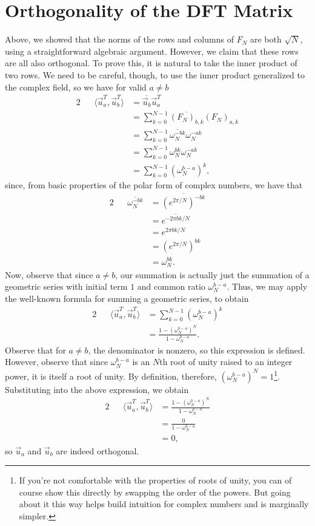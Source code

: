 \documentclass[letterpaper]{article}
\theoremstyle{remark}
\newcommand{\eqn}[1]{\begin{alignat*}{2}#1\end{alignat*}}
\begin{document}
\section{Orthogonality of the DFT Matrix}
Above, we showed that the norms of the rows and columns of $F_N$ are both $\sqrt{N}$, using a straightforward algebraic argument. However, we claim that these rows are all also orthogonal. To prove this, it is natural to take the inner product of two rows. We need to be careful, though, to use the inner product generalized to the complex field, so we have for valid $a \ne b$
\eqn{
    && \langle \vec{u}_a^T, \vec{u}_b^T \rangle &= \overline{\vec{u}_b} \vec{u}_a^T \\
    &&&= \sum_{k=0}^{N-1} \overline{(F_N)_{b, k}} (F_N)_{a, k} \\
    &&&= \sum_{k=0}^{N-1} \overline{\omega_N^{-bk}}\omega_N^{-ak} \\
    &&&= \sum_{k=0}^{N-1} \omega_N^{bk}\omega_N^{-ak} \\
    &&&= \sum_{k=0}^{N-1} (\omega_N^{b-a})^k,
}
since, from basic properties of the polar form of complex numbers, we have that
\eqn{
    && \overline{\omega_N^{-bk}} &= \overline{(e^{2\pi / N})^{-bk}} \\
    &&&= \overline{e^{-2\pi b k / N}} \\
    &&&= e^{2 \pi b k / N} \\
    &&&= (e^{2 \pi / N})^{bk} \\
    &&&= \omega_N^{bk}.
}
Now, observe that since $a \ne b$, our summation is actually just the summation of a geometric series with initial term $1$ and common ratio $\omega_N^{b-a}$. Thus, we may apply the well-known formula for summing a geometric series, to obtain
\eqn{
    && \langle \vec{u}_a^T, \vec{u}_b^T \rangle &= \sum_{k=0}^{N-1} (\omega_N^{b-a})^k \\
    &&&= \frac{1 - (\omega_N^{b-a})^N}{1 - \omega_N^{b-a}}.
}
Observe that for $a \ne b$, the denominator is nonzero, so this expression is defined. However, observe that since $\omega_N^{b-a}$ is an $N$th root of unity raised to an integer power, it is itself a root of unity. By definition, therefore, $(\omega_N^{b-a})^N = 1$\footnote{If you're not comfortable with the properties of roots of unity, you can of course show this directly by swapping the order of the powers. But going about it this way helps build intuition for complex numbers and is marginally simpler.}. Substituting into the above expression, we obtain
\eqn{
    && \langle \vec{u}_a^T, \vec{u}_b^T \rangle &= \frac{1 - (\omega_N^{b-a})^N}{1 - \omega_N^{b-a}} \\
    &&&= \frac{0}{1 - \omega_N^{b-a}} \\
    &&&= 0,
}
so $\vec{u}_a$ and $\vec{u}_b$ are indeed orthogonal.
\end{document}
